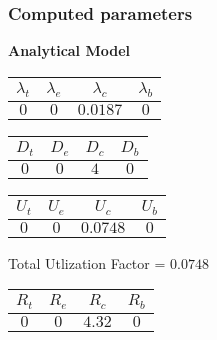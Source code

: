 \documentclass{article}
\begin{document}
\subsubsection{Computed parameters}
\begin{minipage}{0.5\textwidth}
\centering	\textbf{Analytical Model}
\begin{table}[H]
\centering
\begin{tabular}{@{}cccc@{}}
\toprule
$\lambda_t$ & $\lambda_e$ & $\lambda_c$ & $\lambda_b$\\
\midrule
$0$ & $0$ & $0.0187$ & $0$\\
\bottomrule
\end{tabular}
\end{table}\begin{table}[H]
\centering
\begin{tabular}{@{}cccc@{}}
\toprule
$D_t$ & $D_e$ & $D_c$ & $D_b$\\
\midrule
$0$ & $0$ & $4$ & $0$\\
\bottomrule
\end{tabular}
\end{table}\begin{table}[H]
\centering
\begin{tabular}{@{}cccc@{}}
\toprule
$U_t$ & $U_e$ & $U_c$ & $U_b$\\
\midrule
$0$ & $0$ & $0.0748$ & $0$\\
\bottomrule
\end{tabular}
\end{table}
\centering Total Utlization Factor = $0.0748$
\begin{table}[H]
\centering
\begin{tabular}{@{}cccc@{}}
\toprule
$R_t$ & $R_e$ & $R_c$ & $R_b$\\
\midrule
$0$ & $0$ & $4.32$ & $0$\\
\bottomrule
\end{tabular}
\end{table}
\end{minipage}
\end{document}
